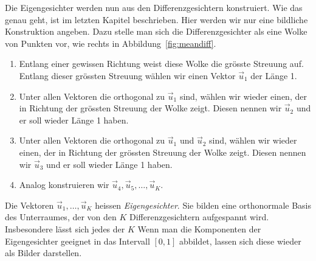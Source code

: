 Die Eigengesichter werden nun aus den Differenzgesichtern konstruiert.
Wie das genau geht, ist im letzten Kapitel beschrieben.
Hier werden wir nur eine bildliche Konstruktion angeben.
Dazu stelle man sich die Differenzgesichter als eine \glqq{}Wolke\grqq{} von Punkten vor, wie rechts in Abbildung~\ref{fig:meandiff}.
\begin{enumerate}[leftmargin=3cm, label=Schritt \arabic*:]
	\item Entlang einer gewissen Richtung weist diese Wolke die grösste Streuung auf.
	Entlang dieser grössten Streuung wählen wir einen Vektor $\vec u_1$ der Länge 1.
	\item Unter allen Vektoren die orthogonal zu $\vec u_1$ sind, wählen wir wieder einen, der in Richtung der grössten Streuung der Wolke zeigt.
	Diesen nennen wir $\vec u_2$ und er soll wieder Länge 1 haben.
	\item Unter allen Vektoren die orthogonal zu $\vec u_1$ und $\vec u_2$ sind, wählen wir wieder einen, der in Richtung der grössten Streuung der Wolke zeigt.
	Diesen nennen wir $\vec u_3$ und er soll wieder Länge 1 haben.
	\item Analog konstruieren wir $\vec u_4,\vec u_5,\ldots,\vec u_K$.
\end{enumerate}
Die Vektoren $\vec u_1,\ldots,\vec u_K$ heissen \textit{Eigengesichter}.
Sie bilden eine orthonormale Basis des Unterraumes, der von den $K$ Differenzgesichtern aufgespannt wird.
Insbesondere lässt sich jedes der $K$
Wenn man die Komponenten der Eigengesichter geeignet in das Intervall $\left[0,1\right]$ abbildet, lassen sich diese wieder als Bilder darstellen.
